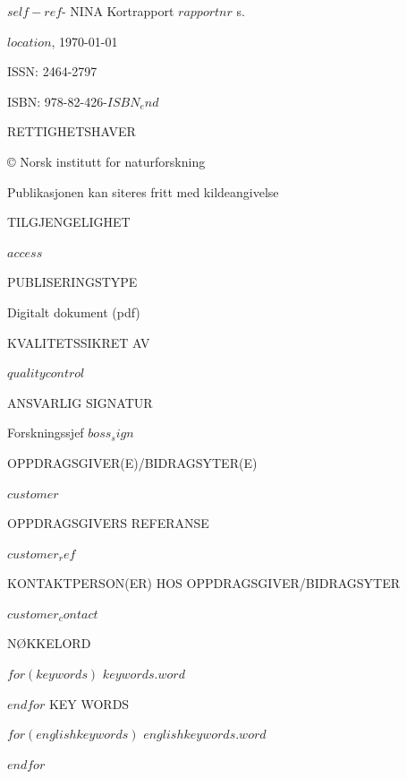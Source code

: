 \documentclass[11pt, a4paper]{article}
\newcommand{\smallspace}{\vspace{3mm}}
\begin{document}
\footnotesize{$self-ref$}- NINA Kortrapport $rapportnr$ \pageref{LastPage} s. \par \smallspace
$location$, \today \par \smallspace
ISSN: 2464-2797 \par
ISBN: 978-82-426-$ISBN_end$ \par  \smallspace
{\footnotesize{RETTIGHETSHAVER}} \par
© Norsk institutt for naturforskning  \par
Publikasjonen kan siteres fritt med kildeangivelse \par \smallspace
{\footnotesize{TILGJENGELIGHET}} \par
$access$ \par \smallspace
{\footnotesize{PUBLISERINGSTYPE}} \par
Digitalt dokument (pdf) \par \smallspace
{\footnotesize{KVALITETSSIKRET AV}} \par
$qualitycontrol$ \par \smallspace
{\footnotesize{ANSVARLIG SIGNATUR}} \par
Forskningssjef $boss_sign$ \par \smallspace
{\footnotesize{OPPDRAGSGIVER(E)/BIDRAGSYTER(E)}} \par
$customer$ \par \smallspace
{\footnotesize{OPPDRAGSGIVERS REFERANSE}} \par
$customer_ref$ \par \smallspace
{\footnotesize{KONTAKTPERSON(ER) HOS OPPDRAGSGIVER/BIDRAGSYTER}} \par
$customer_contact$ \par \smallspace
{\footnotesize{NØKKELORD}} \par\smallskip
$for(keywords)$
\small{$keywords.word$} \par
$endfor$
\vspace{5mm}
KEY WORDS \par\smallskip
$for(englishkeywords)$
\small{$englishkeywords.word$} \par
$endfor$

\vfill
\noindent
\footnotesize
\end{document}
